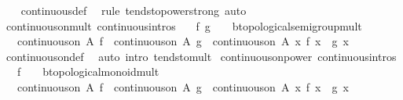 \begin{isabellebody}
%
\isadelimproof
\ \ %
\endisadelimproof
%
\isatagproof
{}\isamarkupfalse%
\ continuous{\isacharunderscore}{\kern0pt}def\ \isamarkupfalse%
\ {\isacharparenleft}{\kern0pt}rule\ tendsto{\isacharunderscore}{\kern0pt}power{\isacharunderscore}{\kern0pt}strong{\isacharparenright}{\kern0pt}\ auto%
\endisatagproof
{\isafoldproof}%
%
\isadelimproof
\isanewline
%
\endisadelimproof
\isanewline
{}\isamarkupfalse%
\ continuous{\isacharunderscore}{\kern0pt}on{\isacharunderscore}{\kern0pt}mult{\isacharprime}{\kern0pt}\ {\isacharbrackleft}{\kern0pt}continuous{\isacharunderscore}{\kern0pt}intros{\isacharbrackright}{\kern0pt}{\isacharcolon}{\kern0pt}\isanewline
\ \ \ f\ g\ {\isacharcolon}{\kern0pt}{\isacharcolon}{\kern0pt}\ {\isachardoublequoteopen}{\isacharunderscore}{\kern0pt}\ {\isasymRightarrow}\ {\isacharprime}{\kern0pt}b{\isacharcolon}{\kern0pt}{\isacharcolon}{\kern0pt}topological{\isacharunderscore}{\kern0pt}semigroup{\isacharunderscore}{\kern0pt}mult{\isachardoublequoteclose}\isanewline
\ \ \ {\isachardoublequoteopen}continuous{\isacharunderscore}{\kern0pt}on\ A\ f\ {\isasymLongrightarrow}\ continuous{\isacharunderscore}{\kern0pt}on\ A\ g\ {\isasymLongrightarrow}\ continuous{\isacharunderscore}{\kern0pt}on\ A\ {\isacharparenleft}{\kern0pt}{\isasymlambda}x{\isachardot}{\kern0pt}\ f\ x\ {\isacharasterisk}{\kern0pt}\ g\ x{\isacharparenright}{\kern0pt}{\isachardoublequoteclose}\isanewline
%
\isadelimproof
\ \ %
\endisadelimproof
%
\isatagproof
{}\isamarkupfalse%
\ continuous{\isacharunderscore}{\kern0pt}on{\isacharunderscore}{\kern0pt}def\ \isamarkupfalse%
\ {\isacharparenleft}{\kern0pt}auto\ intro{\isacharcolon}{\kern0pt}\ tendsto{\isacharunderscore}{\kern0pt}mult{\isacharparenright}{\kern0pt}%
\endisatagproof
{\isafoldproof}%
%
\isadelimproof
\isanewline
%
\endisadelimproof
\isanewline
{}\isamarkupfalse%
\ continuous{\isacharunderscore}{\kern0pt}on{\isacharunderscore}{\kern0pt}power{\isacharprime}{\kern0pt}\ {\isacharbrackleft}{\kern0pt}continuous{\isacharunderscore}{\kern0pt}intros{\isacharbrackright}{\kern0pt}{\isacharcolon}{\kern0pt}\isanewline
\ \ \ f\ {\isacharcolon}{\kern0pt}{\isacharcolon}{\kern0pt}\ {\isachardoublequoteopen}{\isacharunderscore}{\kern0pt}\ {\isasymRightarrow}\ {\isacharprime}{\kern0pt}b{\isacharcolon}{\kern0pt}{\isacharcolon}{\kern0pt}topological{\isacharunderscore}{\kern0pt}monoid{\isacharunderscore}{\kern0pt}mult{\isachardoublequoteclose}\isanewline
\ \ \ {\isachardoublequoteopen}continuous{\isacharunderscore}{\kern0pt}on\ A\ f\ {\isasymLongrightarrow}\ continuous{\isacharunderscore}{\kern0pt}on\ A\ g\ {\isasymLongrightarrow}\ continuous{\isacharunderscore}{\kern0pt}on\ A\ {\isacharparenleft}{\kern0pt}{\isasymlambda}x{\isachardot}{\kern0pt}\ f\ x\ {\isacharcircum}{\kern0pt}\ g\ x{\isacharparenright}{\kern0pt}{\isachardoublequoteclose}\isanewline

\end{isabellebody}
